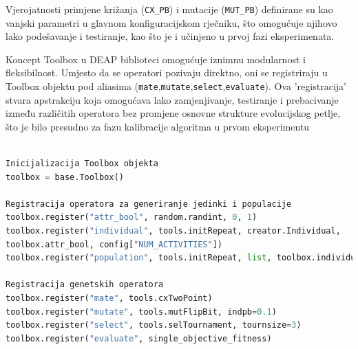 Vjerojatnosti primjene križanja (\texttt{CX\_PB}) i mutacije (\texttt{MUT\_PB}) definirane su kao vanjski parametri u glavnom konfiguracijskom rječniku, što omogućuje njihovo lako podešavanje i testiranje, kao što je i učinjeno u prvoj fazi eksperimenata.

Koncept Toolbox u DEAP biblioteci omogućuje iznimnu modularnost i fleksibilnost. Umjesto da se operatori pozivaju direktno, oni se registriraju u Toolbox objektu pod aliasima (\texttt{mate},\texttt{mutate},\texttt{select},\texttt{evaluate}). Ova 'registracija' stvara apstrakciju koja omogućava lako zamjenjivanje, testiranje i prebacivanje između različitih operatora bez promjene osnovne strukture evolucijskog petlje, što je bilo presudno za fazu kalibracije algoritma u prvom eksperimentu

\begin{lstlisting}[language=Python, caption={Primjer konfiguracije DEAP Toolbox-a za genetske operatore.}, label={lst:toolbox}]

Inicijalizacija Toolbox objekta
toolbox = base.Toolbox()

Registracija operatora za generiranje jedinki i populacije
toolbox.register("attr_bool", random.randint, 0, 1)
toolbox.register("individual", tools.initRepeat, creator.Individual,
toolbox.attr_bool, config["NUM_ACTIVITIES"])
toolbox.register("population", tools.initRepeat, list, toolbox.individual)

Registracija genetskih operatora
toolbox.register("mate", tools.cxTwoPoint)
toolbox.register("mutate", tools.mutFlipBit, indpb=0.1)
toolbox.register("select", tools.selTournament, tournsize=3)
toolbox.register("evaluate", single_objective_fitness)
\end{lstlisting}

